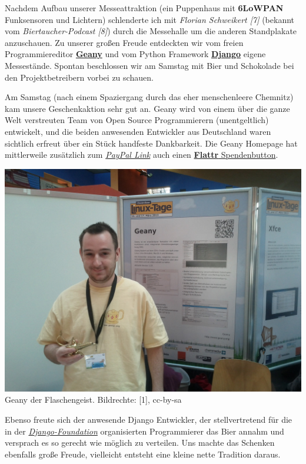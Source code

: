 Nachdem Aufbau unserer Messeattraktion (ein Puppenhaus mit \textbf{6LoWPAN} Funksensoren und Lichtern) schlenderte ich mit \textit{Florian Schweikert [7]} (bekannt vom \textit{Biertaucher-Podcast [8]}) durch die Messehalle um die anderen Standplakate anzuschauen. Zu unserer großen Freude entdeckten wir vom freien Programmiereditor \href{http://geany.org/}{\textbf{Geany}} und vom Python Framework \href{https://www.djangoproject.com/}{\textbf{Django}} eigene Messestände. Spontan beschlossen wir am Samstag mit Bier und Schokolade bei den Projektbetreibern vorbei zu schauen.

Am Samstag (nach einem Spaziergang durch das eher menschenleere Chemnitz) kam unsere Geschenkaktion sehr gut an. Geany wird von einem über die ganze Welt verstreuten Team von  Open Source Programmierern (unentgeltlich) entwickelt, und die beiden anwesenden Entwickler aus Deutschland waren sichtlich erfreut über ein Stück handfeste Dankbarkeit. Die Geany Homepage hat mittlerweile zusätzlich zum \href{https://www.paypal.com/cgi-bin/webscr?cmd=_s-xclick&hosted_button_id=8049199&lc=GB}{\textit{PayPal Link}} auch einen  \href{http://flattr.com/thing/1151425/Geany}{\textbf{Flattr} Spendenbutton}. 

\begin{center}
\includegraphics[width=\linewidth]{chemnitz/chemnitz_geany2.jpg}
\footnotesize{Geany der Flaschengeist. Bildrechte: [1], cc-by-sa}
\end{center}

Ebenso freute sich der anwesende Django Entwickler, der stellvertretend für die in der \href{https://www.djangoproject.com/foundation/}{\textit{Django-Foundation}} organisierten  Programmierer das Bier annahm und versprach es so gerecht wie möglich zu verteilen. Uns machte das Schenken ebenfalls große Freude, vielleicht entsteht eine kleine nette Tradition daraus.

